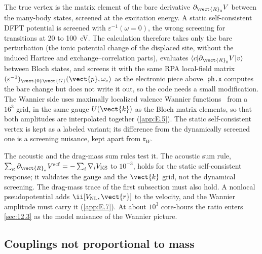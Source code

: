 The true vertex is the matrix element of the bare derivative $\partial_{\vect{R}_0}V$ between the many-body states, screened at the excitation energy. A static self-consistent DFPT potential is screened with $\varepsilon^{-1}(\omega = 0)$, the wrong screening for transitions at 20 to \SI{100}{eV}. The calculation therefore takes only the bare perturbation (the ionic potential change of the displaced site, without the induced Hartree and exchange--correlation parts), evaluates $\langle c|\partial_{\vect{R}_0}V|v\rangle$ between Bloch states, and screens it with the same RPA local-field matrix $(\varepsilon^{-1})_{\vect{0}\vect{G}}(\vect{p},\omega_e)$ as the electronic piece above. \texttt{ph.x} computes the bare change but does not write it out, so the code needs a small modification. The Wannier side uses maximally localized valence Wannier functions~\cite{pizzi2020wannier90} from a $16^3$ grid, in the same gauge $U(\vect{k})$ as the Bloch matrix elements, so that both amplitudes are interpolated together (\cref{app:E.5}). The static self-consistent vertex is kept as a labeled variant; its difference from the dynamically screened one is a screening nuisance, kept apart from $\mathfrak{r}_W$.

The acoustic and the drag-mass sum rules test it. The acoustic sum rule, $\sum_\kappa\partial_{\vect{R}_\kappa}V^{\mathrm{scf}} = -\sum_i\nabla_iV_{\mathrm{KS}}$ to $10^{-3}$, holds for the static self-consistent response; it validates the gauge and the $\vect{k}$ grid, not the dynamical screening. The drag-mass trace of the first subsection must also hold. A nonlocal pseudopotential adds $\ii[V_{\mathrm{NL}},\vect{r}]$ to the velocity, and the Wannier amplitude must carry it (\cref{app:E.7}). At about $10^3$ core-hours the ratio enters \cref{sec:12.3} as the model nuisance of the Wannier picture.

\subsection{Couplings not proportional to mass}

